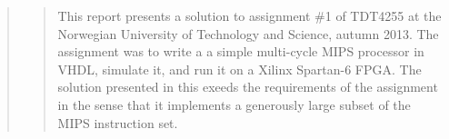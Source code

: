 \begin{quote}
\begin{quote}
This report presents a solution to assignment \#1 of TDT4255 at the Norwegian University of Technology and Science, autumn 2013.
The assignment was to write a a simple multi-cycle MIPS processor in VHDL, simulate it, and run it on a Xilinx Spartan-6 FPGA.
The solution presented in this exeeds the requirements of the assignment in the sense that it implements a generously large subset of the MIPS instruction set.
\end{quote}
\end{quote}
